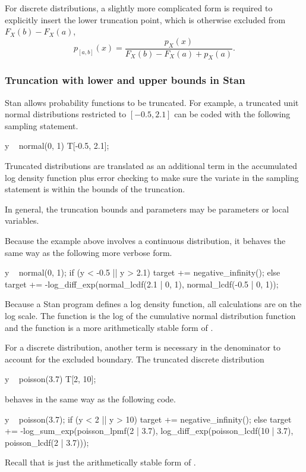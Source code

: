 For discrete distributions, a slightly more complicated form is
required to explicitly insert the lower truncation point, which is
otherwise excluded from $F_X(b) - F_X(a)$,
\[
p_{[a,b]}(x) = \frac{p_X(x)}
                  {F_X(b) - F_X(a) + p_X(a)}.
\]

\subsubsection{Truncation with lower and upper bounds in Stan}

Stan allows probability functions to be truncated.  For example, a
truncated unit normal distributions restricted to $[-0.5, 2.1]$
can be coded with the following sampling statement.
%
\begin{stancode}
y ~ normal(0, 1) T[-0.5, 2.1];
\end{stancode}
%
Truncated distributions are translated as an additional term in the
accumulated log density function plus error checking to make sure the
variate in the sampling statement is within the bounds of the
truncation.

In general, the truncation bounds and parameters may be parameters or
local variables.

Because the example above involves a continuous distribution, it
behaves the same way as the following more verbose form.
%
\begin{stancode}
y ~ normal(0, 1);
if (y < -0.5 || y > 2.1)
  target += negative_infinity();
else
  target += -log_diff_exp(normal_lcdf(2.1 | 0, 1),
                          normal_lcdf(-0.5 | 0, 1));
\end{stancode}
%
Because a Stan program defines a log density function, all
calculations are on the log scale.  The function 
is the log of the cumulative normal distribution function and the
function  is a more arithmetically stable
form of .

For a discrete distribution, another term is necessary in the
denominator to account for the excluded boundary.  The truncated
discrete distribution
%
\begin{stancode}
y ~ poisson(3.7) T[2, 10];
\end{stancode}
%
behaves in the same way as the following code.
%
\begin{stancode}
y ~ poisson(3.7);
if (y < 2 || y > 10) 
  target += negative_infinity();
else
  target += -log_sum_exp(poisson_lpmf(2 | 3.7),
                         log_diff_exp(poisson_lcdf(10 | 3.7),
                                      poisson_lcdf(2 | 3.7)));
\end{stancode}
%
Recall that  is just the arithmetically
stable form of .


